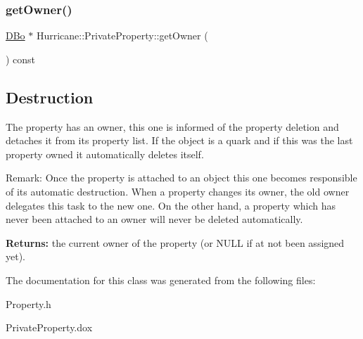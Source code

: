 \subsubsection{\texorpdfstring{get\+Owner()}{getOwner()}}
{\footnotesize\ttfamily \hyperlink{classHurricane_1_1DBo}{D\+Bo} $\ast$ Hurricane\+::\+Private\+Property\+::get\+Owner (\begin{DoxyParamCaption}{ }\end{DoxyParamCaption}) const\hspace{0.3cm}{\ttfamily [inline]}}

\hypertarget{classHurricane_1_1PrivateProperty_secPrivatePropertyDestruction}{}\subsection{Destruction}\label{classHurricane_1_1PrivateProperty_secPrivatePropertyDestruction}
The property has an owner, this one is informed of the property deletion and detaches it from its property list. If the object is a quark and if this was the last property owned it automatically deletes itself.

\begin{DoxyParagraph}{Remark\+:}
Once the property is attached to an object this one becomes responsible of its automatic destruction. When a property changes its owner, the old owner delegates this task to the new one. On the other hand, a property which has never been attached to an owner will never be deleted automatically.
\end{DoxyParagraph}
{\bfseries Returns\+:} the current owner of the property (or N\+U\+LL if at not been assigned yet). 

The documentation for this class was generated from the following files\+:\begin{DoxyCompactItemize}
\item 
Property.\+h\item 
Private\+Property.\+dox\end{DoxyCompactItemize}
